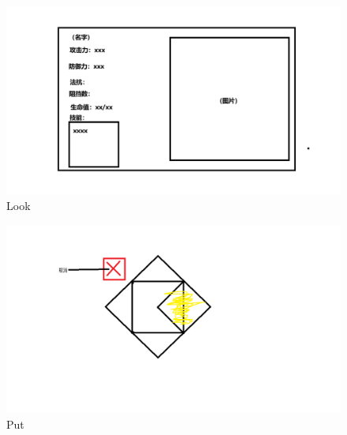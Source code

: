 \documentclass[a4paper,12pt]{article}
\begin{document}
	\begin{figure}[p]
		\centering
		\includegraphics[width=1\textwidth]{look}
		\caption{Look}
	\end{figure}
	\begin{figure}[p]
		\centering
		\includegraphics[width=1\textwidth]{put}
		\caption{Put}
	\end{figure}
\end{document}
